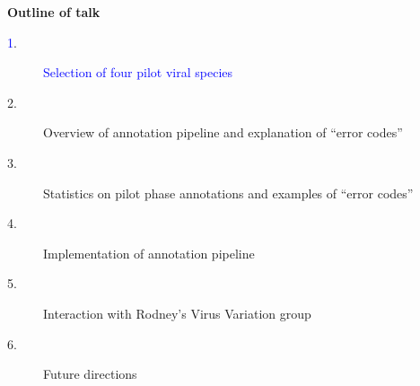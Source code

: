 \documentclass[landscape]{slides}
\begin{document}
\begin{slide}
\begin{center}
\textbf{Outline of talk}

\small
\begin{description}
\item[\textcolor{blue}1.] \textcolor{blue}{Selection of four pilot viral species}
\item[2.] Overview of annotation pipeline and explanation of ``error codes''
\item[3.] Statistics on pilot phase annotations and examples of ``error codes''
\item[4.] Implementation of annotation pipeline
\item[5.] Interaction with Rodney's Virus Variation group
\item[6.] Future directions
\end{description}

\end{center}
\vfill
\end{slide}
\end{document}
